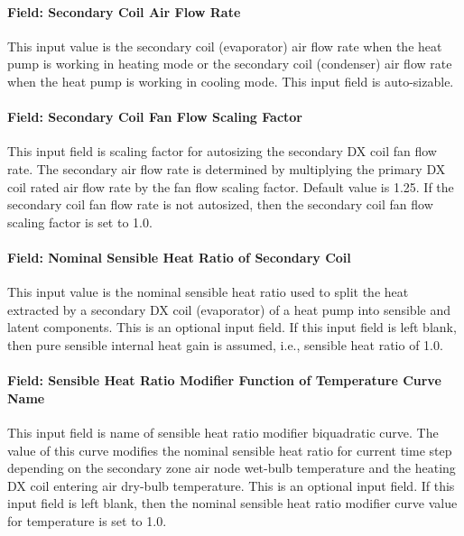 \paragraph{Field: Secondary Coil Air Flow Rate}\label{field-secondary-coil-air-flow-rate}

This input value is the secondary coil (evaporator) air flow rate when the heat pump is working in heating mode or the secondary coil (condenser) air flow rate when the heat pump is working in cooling mode. This input field is auto-sizable.

\paragraph{Field: Secondary Coil Fan Flow Scaling Factor}\label{field-secondary-coil-fan-flow-scaling-factor}

This input field is scaling factor for autosizing the secondary DX coil fan flow rate. The secondary air flow rate is determined by multiplying the primary DX coil rated air flow rate by the fan flow scaling factor. Default value is 1.25. If the secondary coil fan flow rate is not autosized, then the secondary coil fan flow scaling factor is set to 1.0.

\paragraph{Field: Nominal Sensible Heat Ratio of Secondary Coil}\label{field-nominal-sensible-heat-ratio-of-secondary-coil}

This input value is the nominal sensible heat ratio used to split the heat extracted by a secondary DX coil (evaporator) of a heat pump into sensible and latent components. This is an optional input field. If this input field is left blank, then pure sensible internal heat gain is assumed, i.e., sensible heat ratio of 1.0.

\paragraph{Field: Sensible Heat Ratio Modifier Function of Temperature Curve Name}\label{field-sensible-heat-ratio-modifier-function-of-temperature-curve-name}

This input field is name of sensible heat ratio modifier biquadratic curve. The value of this curve modifies the nominal sensible heat ratio for current time step depending on the secondary zone air node wet-bulb temperature and the heating DX coil entering air dry-bulb temperature. This is an optional input field. If this input field is left blank, then the nominal sensible heat ratio modifier curve value for temperature is set to 1.0.


